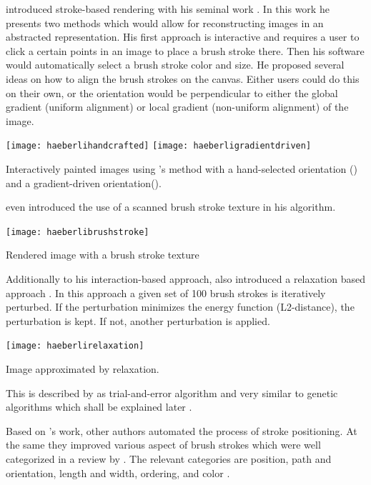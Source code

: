 \citeauthor*{paintbynumbers} introduced stroke-based rendering with his seminal work  \cite{paintbynumbers}.
In this work he presents two methods which would allow for reconstructing images in an abstracted representation.
His first approach is interactive and requires a user to click a certain points in an image to place a brush stroke there.
Then his software would automatically select a brush stroke color and size.
He proposed several ideas on how to align the brush strokes on the canvas.
Either users could do this on their own, or the orientation would be perpendicular to either the global gradient (uniform alignment) or local gradient (non-uniform alignment) of the image.
\begin{marginfigure}
    \texttt{[image: haeberlihandcrafted]}
    \texttt{[image: haeberligradientdriven]}
    \caption[]{Interactively painted images using \citeauthor*{paintbynumbers}'s method with a hand-selected orientation () and a gradient-driven orientation().}
\end{marginfigure}
\citeauthor*{paintbynumbers} even introduced the use of a scanned brush stroke texture in his algorithm.
\begin{marginfigure}
    \texttt{[image: haeberlibrushstroke]}
    \caption[]{Rendered image with a brush stroke texture}
\end{marginfigure}

Additionally to his interaction-based approach, \citeauthor*{paintbynumbers} also introduced a relaxation based approach \cite{paintbynumbers}.
In this approach a given set of 100 brush strokes is iteratively perturbed.
If the perturbation minimizes the energy function (L2-distance), the perturbation is kept.
If not, another perturbation is applied.
\begin{marginfigure}
    \texttt{[image: haeberlirelaxation]}
    \caption[]{Image approximated by relaxation.}
\end{marginfigure}
This is described by \citeauthor*{hertzmannreview} as trial-and-error algorithm and very similar to genetic algorithms which shall be explained later \cite{hertzmannreview}.

Based on \citeauthor*{paintbynumbers}'s work, other authors automated the process of stroke positioning.
At the same they improved various aspect of brush strokes which were well categorized in a review by \citeauthor*{PRreview}.
The relevant categories are position, path and orientation, length and width, ordering, and color \cite{PRveview}.

